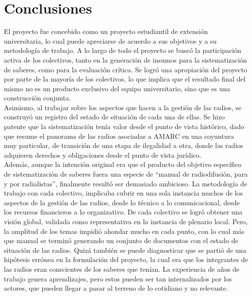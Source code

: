 \chapter{Conclusiones}

El proyecto fue concebido como un proyecto estudiantil de extensión universitaria, lo cual puede apreciarse de acuerdo a sus objetivos y a su metodología de trabajo. A lo largo de todo el proyecto se buscó la participación activa de los colectivos, tanto en la generación de insumos para la sistematización de saberes, como para la evaluación crítica. Se logró una apropiación del proyecto por parte de la mayoría de los colectivos, lo que implica que el resultado final del mismo no es un producto exclusivo del equipo universitario, sino que es una construcción conjunta.\\

Asimismo, al trabajar sobre los aspectos que hacen a la gestión de las radios, se construyó un registro del estado de situación de cada una de ellas. Se hizo patente que la sistematización tenía valor desde el punto de vista histórico, dado que resume el panorama de las radios asociadas a AMARC en una coyuntura muy particular, de transición de una etapa de ilegalidad a otra, donde las radios adquieren derechos y obligaciones desde el punto de vista jurídico.\\

Además, aunque la intención original era que el producto del objetivo específico de sistematización de saberes fuera una especie de “manual de radiodifusión, para y por radialistas”, finalmente resultó ser demasiado ambicioso. La metodología de trabajo con cada colectivo, implicaba cubrir en una sola instancia muchos de los aspectos de la gestión de las radios, desde lo técnico a lo comunicacional, desde los recursos financieros a lo organizativo. De cada colectivo se logró obtener una visión global, validada como representativa en la instancia de plenario local. Pero, la amplitud de los temas impidió ahondar mucho en cada punto, con lo cual más que manual se terminó generando un conjunto de documentos con el estado de situación de las radios. Quizá también se puede diagnosticar que se partió de una hipótesis errónea en la formulación del proyecto, la cual era que los integrantes de las radios eran conscientes de los saberes que tenían. La experiencia de años de trabajo genera aprendizajes, pero estos pueden ser tan internalizados por los actores, que pueden llegar a pasar al terreno de lo cotidiano y no relevante.\\

